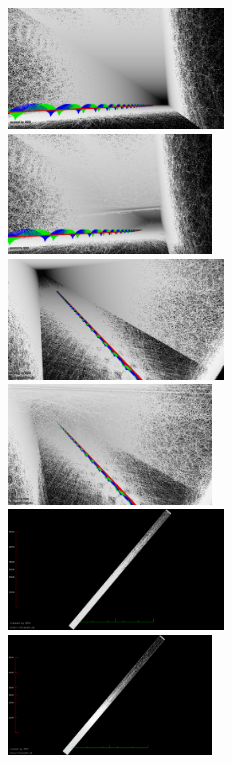 \begin{figure}
	\centering
	\includegraphics[width=0.51\textwidth]{images/perfect_bottom}\hfill
	\includegraphics[width=0.48\textwidth]{images/noisy_pose_and_range_bottom}\\
	\includegraphics[width=0.51\textwidth]{images/perfect_top}\hfill
	\includegraphics[width=0.48\textwidth]{images/noisy_pose_and_range_top}\\
	\includegraphics[width=0.51\textwidth]{images/perfect_top_view}\hfill
	\includegraphics[width=0.48\textwidth]{images/noisy_pose_and_range_top_view}\\\vspace{0.5cm}

\end{figure}
